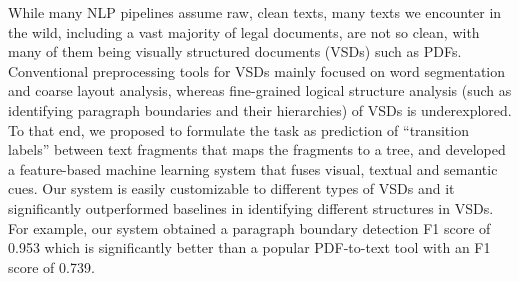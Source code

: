 While many NLP pipelines assume raw, clean texts, many texts we encounter in the wild, including a vast majority of legal documents, are not so clean, with many of them being visually structured documents (VSDs) such as PDFs. Conventional preprocessing tools for VSDs mainly focused on word segmentation and coarse layout analysis, whereas fine-grained logical structure analysis (such as identifying paragraph boundaries and their hierarchies) of VSDs is underexplored. To that end, we proposed to formulate the task as prediction of ``transition labels'' between text fragments that maps the fragments to a tree, and developed a feature-based machine learning system that fuses visual, textual and semantic cues. Our system is easily customizable to different types of VSDs and it significantly outperformed baselines in identifying different structures in VSDs. For example, our system obtained a paragraph boundary detection F1 score of 0.953 which is significantly better than a popular PDF-to-text tool with an F1 score of 0.739.
